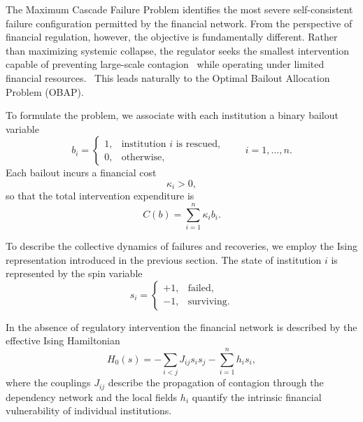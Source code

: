\documentclass[aps,reprint,superscriptaddress,pra]{revtex4-2}
\begin{document}
The Maximum Cascade Failure Problem identifies the most severe self-consistent failure configuration permitted by the financial network. From the perspective of financial regulation, however, the objective is fundamentally different. Rather than maximizing systemic collapse, the regulator seeks the smallest intervention capable of preventing large-scale contagion~\cite{acharya2007many} while operating under limited financial resources.~\cite{capponi2022optimal,jackson2024credit} This leads naturally to the Optimal Bailout Allocation Problem (OBAP). \cite{dasaratha2024diversified}

To formulate the problem, we associate with each institution a binary bailout variable
\begin{equation}
b_i=
\begin{cases}
1,&\text{institution $i$ is rescued},\\
0,&\text{otherwise},
\end{cases}
\qquad
i=1,\ldots,n.
\end{equation}
Each bailout incurs a financial cost
\begin{equation}
\kappa_i>0,
\end{equation}
so that the total intervention expenditure is
\begin{equation}
C(b)
=
\sum_{i=1}^{n}\kappa_i b_i.
\label{eq:bailout_cost}
\end{equation}

To describe the collective dynamics of failures and recoveries, we employ the Ising representation introduced in the previous section. The state of institution $i$ is represented by the spin variable
\begin{equation}
s_i=
\begin{cases}
+1,&\text{failed},\\
-1,&\text{surviving}.
\end{cases}
\label{eq:spin_definition}
\end{equation}

In the absence of regulatory intervention the financial network is described by the effective Ising Hamiltonian
\begin{equation}
H_0(s)
=
-\sum_{i<j}J_{ij}s_is_j
-
\sum_{i=1}^{n}h_i s_i,
\label{eq:bare_hamiltonian}
\end{equation}
where the couplings $J_{ij}$ describe the propagation of contagion through the dependency network and the local fields $h_i$ quantify the intrinsic financial vulnerability of individual institutions.
\end{document}
